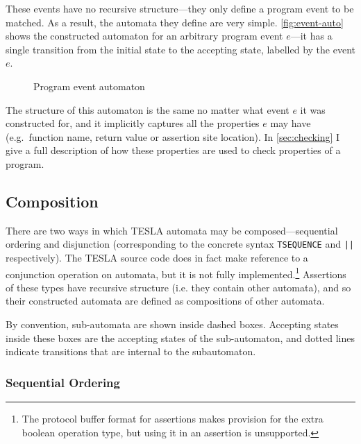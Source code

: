 These events have no recursive structure---they only define a program event to
be matched. As a result, the automata they define are very simple.
\autoref{fig:event-auto} shows the constructed automaton for an arbitrary program event
$e$---it has a single transition from the initial state to the accepting state,
labelled by the event $e$.

\begin{figure}[ht]
  \centering
  \caption{Program event automaton}
  \label{fig:event-auto}
\end{figure}

The structure of this automaton is the same no matter what event $e$ it was
constructed for, and it implicitly captures all the properties $e$ may have
(e.g.\ function name, return value or assertion site location). In
\autoref{sec:checking} I give a full description of how these properties are
used to check properties of a program.

\subsection{Composition}

There are two ways in which TESLA automata may be composed---sequential ordering
and disjunction (corresponding to the concrete syntax \texttt{TSEQUENCE}
and \texttt{||} respectively). The TESLA source code does in fact make
reference to a conjunction operation on automata, but it is not fully
implemented.\footnote{The protocol buffer format for assertions makes provision
for the extra boolean operation type, but using it in an assertion is
unsupported.} Assertions of these types have recursive structure (i.e. they
contain other automata), and so their constructed automata are defined as
compositions of other automata.

By convention, sub-automata are shown inside dashed boxes. Accepting states
inside these boxes are the accepting states of the sub-automaton, and dotted
lines indicate transitions that are internal to the subautomaton.

\subsubsection{Sequential Ordering}

